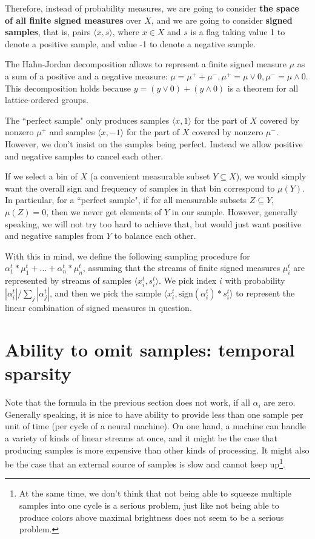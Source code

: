 \documentclass{article}
\begin{document}
Therefore, instead of probability measures, we are going to consider {\bf the space of all 
finite signed measures} over $X$, and we are going to consider {\bf  signed samples}, that is,
pairs $\langle x, s \rangle$, where $x \in X$ and $s$ is a flag taking value 1 to denote a positive sample,
and value -1 to denote a negative sample.

The Hahn-Jordan decomposition allows to represent a finite signed measure $\mu$ as a sum of a positive
and a negative measure: $\mu = \mu^+ + \mu^-, \mu^+ = \mu \vee 0, \mu^- = \mu \wedge 0$.
This decomposition holds because $y = (y \vee 0)+(y \wedge 0)$ is a theorem for all lattice-ordered groups.

The ``perfect sample" only produces samples $\langle x, 1 \rangle$ for the part of $X$ covered by nonzero $\mu^+$ and
samples $\langle x, -1 \rangle$ for the part of $X$ covered by nonzero $\mu^-$. However, we don't insist
on the samples being perfect. Instead we allow positive and negative samples to cancel each other.

If we select a bin of $X$ (a convenient measurable subset $Y \subseteq X$), we would simply want the overall
sign and frequency of samples in that bin correspond to $\mu(Y)$. In particular, for a ``perfect sample", if
for all measurable subsets $Z \subseteq Y$, $\mu(Z) = 0$, then we never get elements of $Y$ in our sample.
However, generally speaking, we will not try too hard to achieve that, but would just want positive and
negative samples from $Y$ to balance each other.

With this in mind, we define the following sampling procedure for $\alpha_1^t * \mu_1^t + \dots +  \alpha_n^t * \mu_n^t$,
assuming that the streams of finite signed measures $\mu_i^t$ are represented by streams of
samples $\langle x_i^t, s_i^t \rangle$. We pick index $i$ with probability $|\alpha_i^t|/\sum_j |\alpha_j^t| $,
and then we pick the sample $\langle x_i^t, \mbox{sign}(\alpha_i^t)* s_i^t \rangle$ to represent the
linear combination of signed measures in question.

\section{Ability to omit samples: temporal sparsity}

Note that the formula in the previous section does not work, if all $\alpha_i$ are zero. Generally speaking, it is nice
to have ability to provide less than one sample per unit of time (per cycle of a neural machine). On one hand,
a machine can handle a variety of kinds of linear streams at once, and it might be the case that producing samples
is more expensive than other kinds of processing. It might also be the case that an external source of samples is
slow and cannot keep up\footnote{At the same time, we  don't think that not being able to squeeze multiple samples
into one cycle is a serious  problem, just like not being able to produce colors above maximal brightness does not
seem to be a serious problem.}.
\end{document}
